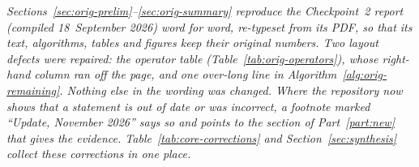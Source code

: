 \noindent\textit{Sections~\ref{sec:orig-prelim}--\ref{sec:orig-summary} reproduce the Checkpoint~2 report (compiled
18~September 2026) word for word, re-typeset from its PDF, so that its text, algorithms, tables and figures
keep their original numbers. Two layout defects were repaired: the operator table
(Table~\ref{tab:orig-operators}), whose right-hand column ran off the page, and one over-long line in
Algorithm~\ref{alg:orig-remaining}. Nothing else in the wording was changed. Where the repository now shows
that a statement is out of date or was incorrect, a footnote marked ``Update, November 2026'' says so and
points to the section of Part~\ref{part:new} that gives the evidence. Table~\ref{tab:core-corrections} and
Section~\ref{sec:synthesis} collect these corrections in one place.}
